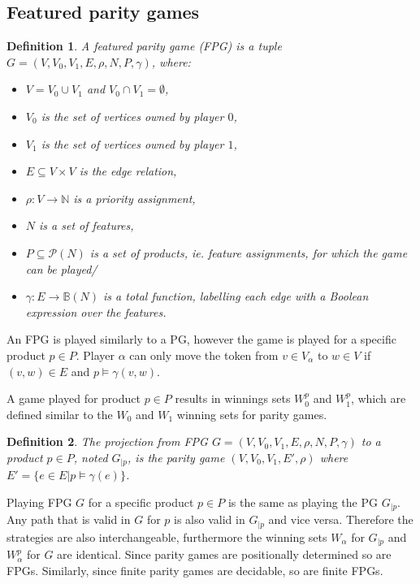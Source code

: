 \documentclass[]{article}
\newtheorem{definition}{Definition}[section]
\begin{document}
\subsection{Featured parity games}
\begin{definition}
	\label{def_FPG}
	A featured parity game (FPG) is a tuple $G = (V,V_0, V_1, E, \rho, N, P, \gamma)$, where:
	\begin{itemize}
		\item $V = V_0 \cup V_1$ and $V_0 \cap V_1 = \emptyset$,
		\item $V_0$ is the set of vertices owned by player $0$,
		\item $V_1$ is the set of vertices owned by player $1$, 
		\item $E \subseteq V \times V$ is the edge relation,
		\item $\rho :  V \rightarrow \mathbb{N}$ is a priority assignment,
		\item $N$ is a set of features,
		\item $P \subseteq \mathcal{P}(N)$ is a set of products, ie. feature assignments, for which the game can be played/
		\item $\gamma : E \rightarrow \mathbb{B}(N)$ is a total function, labelling each edge with a Boolean expression over the features.
	\end{itemize}
\end{definition}
An FPG is played similarly to a PG, however the game is played for a specific product $p \in P$. Player $\alpha$ can only move the token from $v \in V_\alpha$ to $w \in V$ if $(v,w) \in E$ and $p \models \gamma(v,w)$.

A game played for product $p \in P$ results in winnings sets $W_0^p$ and $W_1^p$, which are defined similar to the $W_0$ and $W_1$ winning sets for parity games.

\begin{definition}
	\label{def_FPG_proj}
The projection from FPG $G = (V,V_0, V_1, E, \rho, N, P, \gamma)$ to a product $p \in P$, noted $G_{|p}$, is the parity game $(V,V_0,V_1, E', \rho)$ where $E' = \{ e \in E| p \models \gamma(e) \}$.
\end{definition}

Playing FPG $G$ for a specific product $p\in P$ is the same as playing the PG $G_{|p}$. Any path that is valid in $G$ for $p$ is also valid in $G_{|p}$ and vice versa. Therefore the strategies are also interchangeable, furthermore the winning sets $W_\alpha$ for $G_{|p}$ and $W_\alpha^p$ for $G$ are identical. Since parity games are positionally determined so are FPGs. Similarly, since finite parity games are decidable, so are finite FPGs.
\end{document}
